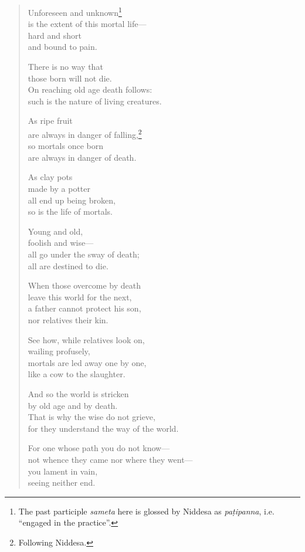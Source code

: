 \documentclass[12pt,openany]{book}%
\begin{document}
\begin{verse}%
Unforeseen and unknown\footnote{The past participle \textit{sameta} here is glossed by Niddesa as \textit{\textsanskrit{paṭipanna}}, i.e. “engaged in the practice”. } \\
is the extent of this mortal life—\\
hard and short \\
and bound to pain. 

There is no way that \\
those born will not die. \\
On reaching old age death follows: \\
such is the nature of living creatures. 

As ripe fruit \\
are always in danger of falling,\footnote{Following Niddesa. } \\
so mortals once born \\
are always in danger of death. 

As clay pots \\
made by a potter \\
all end up being broken, \\
so is the life of mortals. 

Young and old, \\
foolish and wise—\\
all go under the sway of death; \\
all are destined to die. 

When those overcome by death \\
leave this world for the next, \\
a father cannot protect his son, \\
nor relatives their kin. 

See how, while relatives look on, \\
wailing profusely, \\
mortals are led away one by one, \\
like a cow to the slaughter. 

And so the world is stricken \\
by old age and by death. \\
That is why the wise do not grieve, \\
for they understand the way of the world. 

For one whose path you do not know—\\
not whence they came nor where they went—\\
you lament in vain, \\
seeing neither end. 


\end{verse}
\end{document}
